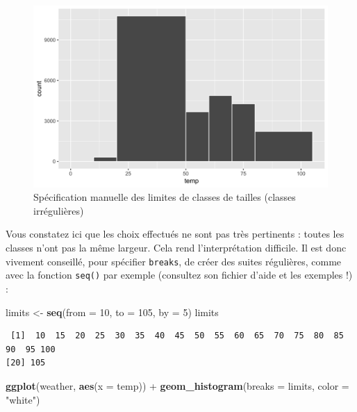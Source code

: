 \documentclass[a4paperpaper,]{article}
\newenvironment{Shaded}{\begin{snugshade}}{\end{snugshade}}
\newcommand{\DataTypeTok}[1]{\textcolor[rgb]{0.00,0.34,0.68}{#1}}
\newcommand{\DecValTok}[1]{\textcolor[rgb]{0.69,0.50,0.00}{#1}}
\newcommand{\KeywordTok}[1]{\textcolor[rgb]{0.12,0.11,0.11}{\textbf{#1}}}
\newcommand{\NormalTok}[1]{\textcolor[rgb]{0.12,0.11,0.11}{#1}}
\newcommand{\OperatorTok}[1]{\textcolor[rgb]{0.12,0.11,0.11}{#1}}
\newcommand{\StringTok}[1]{\textcolor[rgb]{0.75,0.01,0.01}{#1}}
\theoremstyle{definition}
\theoremstyle{definition}
\theoremstyle{definition}
\theoremstyle{remark}
\begin{document}
\begin{figure}[htpb]

{\centering \includegraphics[width=0.9\linewidth]{figure/unnamed-chunk-52-1} 

}

\caption{Spécification manuelle des limites de classes de tailles (classes irrégulières)}\label{fig:unnamed-chunk-52}
\end{figure}

Vous constatez ici que les choix effectués ne sont pas très pertinents :
toutes les classes n'ont pas la même largeur. Cela rend l'interprétation
difficile. Il est donc vivement conseillé, pour spécifier
\texttt{breaks}, de créer des suites régulières, comme avec la fonction
\texttt{seq()} par exemple (consultez son fichier d'aide et les exemples
!) :

\begin{Shaded}
\begin{Highlighting}[]
\NormalTok{limits <-}\StringTok{ }\KeywordTok{seq}\NormalTok{(}\DataTypeTok{from =} \DecValTok{10}\NormalTok{, }\DataTypeTok{to =} \DecValTok{105}\NormalTok{, }\DataTypeTok{by =} \DecValTok{5}\NormalTok{)}
\NormalTok{limits}
\end{Highlighting}
\end{Shaded}

\begin{verbatim}
 [1]  10  15  20  25  30  35  40  45  50  55  60  65  70  75  80  85  90  95 100
[20] 105
\end{verbatim}

\begin{Shaded}
\begin{Highlighting}[]
\KeywordTok{ggplot}\NormalTok{(weather, }\KeywordTok{aes}\NormalTok{(}\DataTypeTok{x =}\NormalTok{ temp)) }\OperatorTok{+}
\StringTok{  }\KeywordTok{geom_histogram}\NormalTok{(}\DataTypeTok{breaks =}\NormalTok{ limits, }\DataTypeTok{color =} \StringTok{"white"}\NormalTok{)}
\end{Highlighting}
\end{Shaded}
\end{document}
